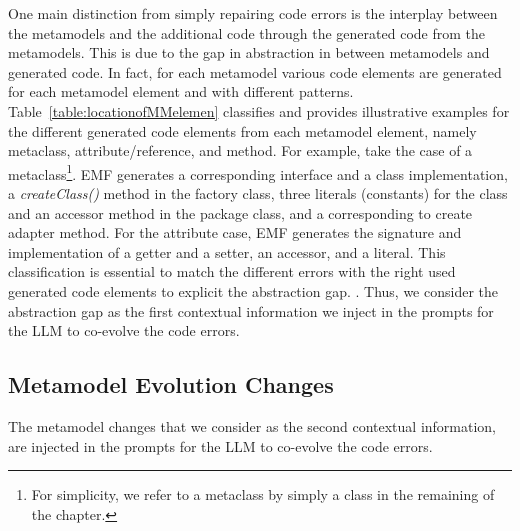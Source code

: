One main distinction from simply repairing code errors is the interplay between the metamodels and the additional code through the generated code from the metamodels. This is due to the gap in abstraction in between metamodels and generated code. In fact, for each metamodel various code elements are generated for each metamodel element and with different patterns.
Table~\ref{table:locationofMMelemen} classifies and provides illustrative examples for the different generated code elements from each metamodel element, namely metaclass, attribute/reference, and method.  %
For example, take the case of a metaclass\footnote{For simplicity, we refer to a metaclass by simply a class in the remaining of the chapter.}. EMF generates a corresponding interface and a class implementation, a \emph{createClass()} method in the factory class, three literals (\ie constants) for the class and an accessor method in the package class, and a corresponding to create adapter method. For the attribute case, EMF generates the signature and implementation of a getter and a setter, an accessor, and a literal. 
This classification is essential to match the different errors with the right used generated code elements to explicit the abstraction gap. . Thus, we consider the abstraction gap as the first contextual information we inject in the prompts for the LLM to co-evolve the code errors. 





\subsection{Metamodel Evolution Changes}
The metamodel changes that we consider as the second contextual information, are injected in the prompts for the LLM to co-evolve the code errors. 

